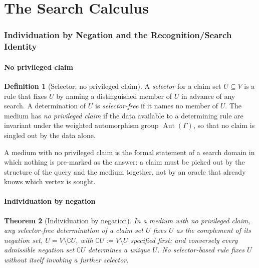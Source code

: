 \documentclass[11pt,twocolumn,a4paper]{article}
\theoremstyle{thmstyle}
\newtheorem{theorem}{Theorem}[section]
\theoremstyle{definition}
\newtheorem{definition}[theorem]{Definition}
\theoremstyle{remark}
\newcommand{\Gph}{\Gamma}
\newcommand{\V}{V}
\newcommand{\co}{\complement}
\begin{document}
\part{The Search Calculus}

\section{Individuation by Negation and the Recognition/Search Identity}
\label{sec:individuation}

\subsection{No privileged claim}

\begin{definition}[Selector; no privileged claim]
\label{def:selector}
A \emph{selector} for a claim set $U\subseteq\V$ is a rule that fixes $U$
by naming a distinguished member of $U$ in advance of any search. A
determination of $U$ is \emph{selector-free} if it names no member of $U$.
The medium has \emph{no privileged claim} if the data available to a
determining rule are invariant under the weighted automorphism group
$\operatorname{Aut}(\Gph)$, so that no claim is singled out by the data
alone.
\end{definition}

A medium with no privileged claim is the formal statement of a search
domain in which nothing is pre-marked as the answer: a claim must be
picked out by the structure of the query and the medium together, not by
an oracle that already knows which vertex is sought.

\subsection{Individuation by negation}

\begin{theorem}[Individuation by negation]
\label{thm:negation}
In a medium with no privileged claim, any selector-free determination of a
claim set $U$ fixes $U$ as the complement of its negation set,
$U=\V\setminus\co U$, with $\co U:=\V\setminus U$ specified first; and
conversely every admissible negation set $\co U$ determines a unique $U$.
No selector-based rule fixes $U$ without itself invoking a further
selector.
\end{theorem}
\end{document}
